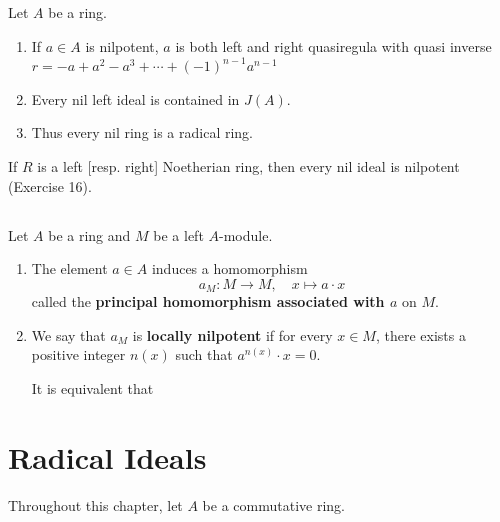 \begin{theorem}
    \label{thm: nil ideal}
    Let $A$ be a ring.
    \begin{enumerate}
        \item
              If $a\in A$ is nilpotent, $a$ is both left and right quasiregula with quasi inverse $r=-a+a^2-a^3+\cdots+(-1)^{n-1} a^{n-1}$
        \item
              Every nil left ideal is contained in $J(A)$.
        \item
              Thus every nil ring is a radical ring.
    \end{enumerate}
\end{theorem}

\begin{proposition}
    If $R$ is a left [resp. right] Noetherian ring, then every nil ideal is nilpotent (Exercise 16).
\end{proposition}

\section{}
\begin{definition}
    Let $A$ be a ring and $M$ be a left $A$-module.
    \begin{enumerate}
        \item
              The element $a\in A$ induces a homomorphism
              \begin{equation*}
                  a_M: M \rightarrow M, \quad x \mapsto a \cdot x
              \end{equation*}
              called the \textbf{principal homomorphism associated with $a$} on $M$.
        \item We say that $a_M$ is \textbf{locally nilpotent} if for every $x \in M$, there exists a positive integer $n(x)$ such that $a^{n(x)}\cdot x=0$.
              \begin{remark}
                  It is equivalent that
              \end{remark}
    \end{enumerate}

\end{definition}


\chapter{Radical Ideals}%
Throughout this chapter, let $A$ be a commutative ring.

